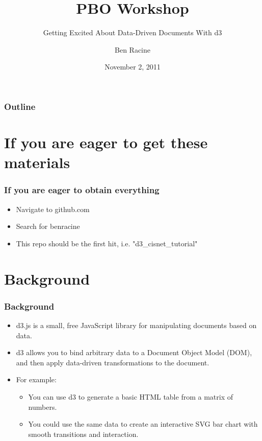 \documentclass{beamer}
\title{PBO Workshop}
\subtitle{Getting Excited About Data-Driven Documents With d3}
\author{Ben Racine \inst{1} }
\institute{\inst{1} Cornerstone Systems NW }
\date{November 2, 2011}
\begin{document}
\begin{frame}
    \frametitle{}
    \titlepage
\end{frame}


 \begin{frame}
    \scriptsize{
        \frametitle{Outline}
        \tableofcontents[pausesections]
    }
 \end{frame}



\section{If you are eager to get these materials}

\begin{frame}
    \frametitle{If you are eager to obtain everything}
    \begin{itemize}
\pause
    \item Navigate to github.com
\pause
    \item Search for benracine
\pause
    \item This repo should be the first hit, i.e. "d3\_cisnet\_tutorial"
    \end{itemize}
\end{frame}


\section{Background}


\begin{frame}
\frametitle{Background}
\begin{itemize}
\item d3.js is a small, free JavaScript library for manipulating documents based on data.
\item d3 allows you to bind arbitrary data to a Document Object Model (DOM), and then apply data-driven transformations to the document. 
\item For example:
    \begin{itemize}
    \item You can use d3 to generate a basic HTML table from a matrix of numbers.
    \item You could use the same data to create an interactive SVG bar chart with smooth transitions and interaction.
    \end{itemize}
\end{itemize}
\end{frame}
\end{document}
